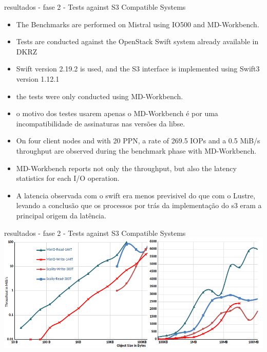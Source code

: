 \documentclass{beamer}
\begin{document}
\begin{frame}{resultados - fase 2 - Tests against S3 Compatible Systems}
	\begin{itemize}
		\item The Benchmarks are performed on Mistral using IO500 and MD-Workbench.
		\item Tests are conducted against the OpenStack Swift system already available in DKRZ
		\item Swift version 2.19.2 is used, and the S3 interface is implemented using Swift3 version 1.12.1
		\item the tests were only conducted using MD-Workbench.
		\item o motivo dos testes usarem apenas o MD-Workbench é por uma incompatibilidade de assinaturas nas versões da libse.
		\item On
		four client nodes and with 20 PPN, a rate of 269.5 IOPs and a 0.5 MiB/s throughput are
		observed during the benchmark phase with MD-Workbench.
		\item MD-Workbench reports not only the throughput, but also the latency statistics for
		each I/O operation.
		\item A latencia observada com o swift era menos previsivel do que com o Lustre, levando a conclusão que os processos por trás da implementação do s3 eram a principal origem da latência.
	\end{itemize}
\end{frame}
\begin{frame}{resultados - fase 2 - Tests against S3 Compatible Systems}
    \includegraphics[width=0.9\paperwidth]{presentation/14.png}
\end{frame}
\end{document}
